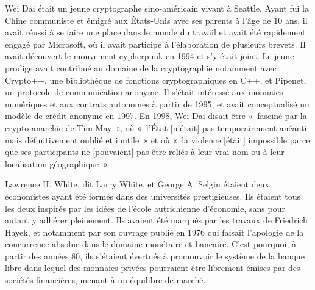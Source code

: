 Wei Dai était un jeune cryptographe sino-américain vivant à Seattle. Ayant fui la Chine communiste et émigré aux États-Unis avec ses parents à l'âge de 10 ans, il avait réussi à se faire une place dans le monde du travail et avait été rapidement engagé par Microsoft, où il avait participé à l'élaboration de plusieurs brevets. Il avait découvert le mouvement cypherpunk en 1994 et s'y était joint. Le jeune prodige avait contribué au domaine de la cryptographie notamment avec Crypto++, une bibliothèque de fonctions cryptographiques en C++, et Pipenet, un protocole de communication anonyme. Il s'était intéressé aux monnaies numériques et aux contrats autonomes à partir de 1995, et avait conceptualisé un modèle de crédit anonyme en 1997. En 1998, Wei Dai disait être «~fasciné par la crypto-anarchie de Tim May~», où «~l'État [n'était] pas temporairement anéanti mais définitivement oublié et inutile~» et où «~la violence [était] impossible parce que ses participants ne [pouvaient] pas être reliés à leur vrai nom ou à leur localisation géographique~». %

Lawrence H. White, dit Larry White, et George A. Selgin étaient deux économistes ayant été formés dans des universités prestigieuses. Ils étaient tous les deux inspirés par les idées de l'école autrichienne d'économie, sans pour autant y adhérer pleinement. Ils avaient été marqués par les travaux de Friedrich Hayek, et notamment par son ouvrage  publié en 1976 qui faisait l'apologie de la concurrence absolue dans le domaine monétaire et bancaire. C'est pourquoi, à partir des années 80, ils s'étaient évertués à promouvoir le système de la banque libre dans lequel des monnaies privées pourraient être librement émises par des sociétés financières, menant à un équilibre de marché.

